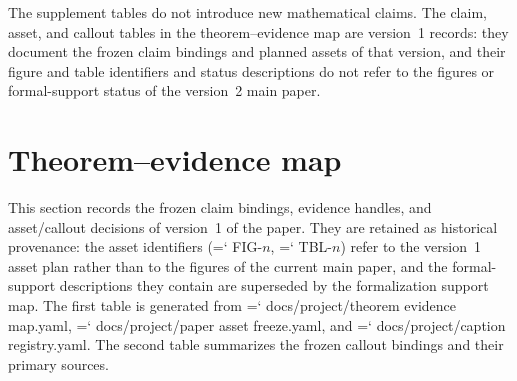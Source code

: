 \documentclass[11pt]{article}
\renewcommand{\texttt}[1]{{\ttfamily\hyphenchar\font=`\-\relax
   \def\_{\textunderscore\penalty50 }\def\/{\char`\/\penalty50 }#1}}
\begin{document}
The supplement tables do not introduce new mathematical claims.
The claim, asset, and callout tables in the theorem--evidence map are version~1 records: they document the frozen claim bindings and planned assets of that version, and their figure and table identifiers and status descriptions do not refer to the figures or formal-support status of the version~2 main paper.
 \section{Theorem--evidence map}
This section records the frozen claim bindings, evidence handles, and asset/callout decisions of version~1 of the paper.
They are retained as historical provenance: the asset identifiers (\texttt{FIG-}$n$, \texttt{TBL-}$n$) refer to the version~1 asset plan rather than to the figures of the current main paper, and the formal-support descriptions they contain are superseded by the formalization support map.
The first table is generated from \texttt{docs/project/theorem\_evidence\_map.yaml}, \texttt{docs/project/paper\_asset\_freeze.yaml}, and \texttt{docs/project/caption\_registry.yaml}.
The second table summarizes the frozen callout bindings and their primary sources.
\end{document}
